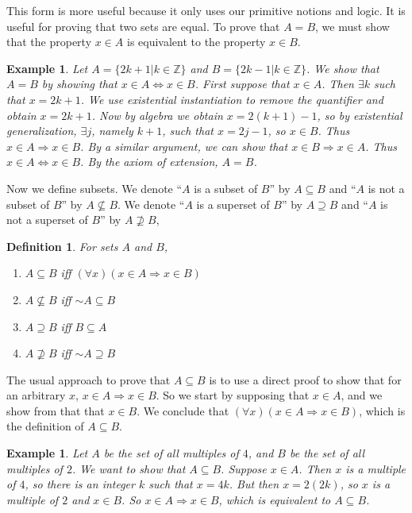 \documentclass[12pt]{article}
\newcommand*{\oldneg}{\mathord{\sim}}
\newcounter{dfnc}
\newcounter{exc}
\newtheorem{dfn}[dfnc]{Definition}
\newtheorem{ex}[exc]{Example}
\begin{document}
This form is more useful because it only uses our primitive notions
and logic.  It is useful for proving that two sets are equal.  To
prove that $A=B$, we must show that the property $x\in A$ is
equivalent to the property $x\in B$.

\begin{ex}
  Let $A=\{2k+1 | k \in \mathbb{Z}\}$ and $B=\{2k-1 |
  k\in\mathbb{Z}\}$.  We show that $A=B$ by showing that $x\in A
  \Leftrightarrow x\in B$.  First suppose that $x\in A$.  Then
  $\exists k$ such that $x=2k+1$.  We use existential instantiation to
  remove the quantifier and obtain $x=2k+1$.  Now by algebra we obtain
  $x=2(k+1)-1$, so by existential generalization, $\exists j$, namely
  $k+1$, such that $x=2j-1$, so $x\in B$.  Thus $x\in A \Rightarrow
  x\in B$.  By a similar argument, we can show that $x\in B
  \Rightarrow x\in A$.  Thus $x\in A \Leftrightarrow x\in B$.  By the
  axiom of extension, $A=B$.
\end{ex}

Now we define subsets.  We denote ``$A$ is a subset of $B$'' by
$A\subseteq B$ and ``$A$ is not a subset of $B$'' by $A\not\subseteq
B$.  We denote ``$A$ is a superset of $B$'' by $A\supseteq B$ and
``$A$ is not a superset of $B$'' by $A\not\supseteq B$,

\begin{dfn}\label{dfn:subset}
  For sets $A$ and $B$,
  \begin{enumerate}[label=\alph*)]
  \item $A\subseteq B$ iff $(\forall x)(x\in A \Rightarrow x\in B)$
  \item $A\not\subseteq B$ iff $\oldneg A\subseteq B$
  \item $A\supseteq B$ iff $B\subseteq A$
  \item $A\not\supseteq B$ iff $\oldneg A\supseteq B$
  \end{enumerate}
\end{dfn}

The usual approach to prove that $A\subseteq B$ is to use a direct
proof to show that for an arbitrary $x$, $x\in A \Rightarrow x\in B$.
So we start by supposing that $x\in A$, and we show from that that
$x\in B$.  We conclude that $(\forall x)(x\in A \Rightarrow x\in B)$,
which is the definition of $A\subseteq B$.

\begin{ex}
  Let $A$ be the set of all multiples of $4$, and $B$ be the set of
  all multiples of $2$.  We want to show that $A\subseteq B$.  Suppose
  $x\in A$.  Then $x$ is a multiple of $4$, so there is an integer $k$
  such that $x=4k$.  But then $x=2(2k)$, so $x$ is a multiple of $2$
  and $x\in B$.  So $x\in A \Rightarrow x\in B$, which is equivalent
  to $A\subseteq B$.
\end{ex}
\end{document}
